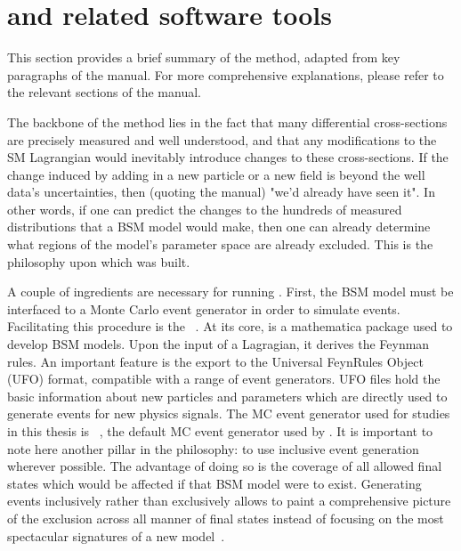 \section{\contur and related software tools}
\label{sec:reinterpretsoftware}
This section provides a brief summary of the \contur method, adapted from key paragraphs of the manual. For more comprehensive explanations, please refer to the relevant sections of the manual.

The backbone of the \contur method lies in the fact that many differential cross-sections are precisely measured and well understood, and that any modifications to the SM Lagrangian would inevitably introduce changes to these cross-sections. If the change induced by adding in a new particle or a new field is beyond the well data's uncertainties, then (quoting the manual) "we'd already have seen it". In other words, if one can predict the changes to the hundreds of \LHC measured distributions that a BSM model would make, then one can already determine what regions of the model's parameter space are already excluded. This is the philosophy upon which \contur was built. 

A couple of ingredients are necessary for running \contur. First, the BSM model must be interfaced to a Monte Carlo event generator in order to simulate events. Facilitating this procedure is the \FeynRules~\cite{}. At its core, \FeynRules is a mathematica package used to develop BSM models. Upon the input of a Lagragian, it derives the Feynman rules. An important feature is the export to the Universal FeynRules Object~\cite{ufo} (UFO) format, compatible with a range of event generators. UFO files hold the basic information about new particles and parameters which are directly used to generate events for new physics signals. The MC event generator used for studies in this thesis is \herwig~\cite{herwig7}, the default MC event generator used by \contur. It is important to note here another pillar in the \contur philosophy: to use inclusive event generation wherever possible. The advantage of doing so is the coverage of all allowed final states which would be affected if that BSM model were to exist. Generating events inclusively rather than exclusively allows \contur to paint a comprehensive picture of the exclusion across all manner of final states instead of focusing on the most spectacular signatures of a new model~\cite{contur-manual}. 

